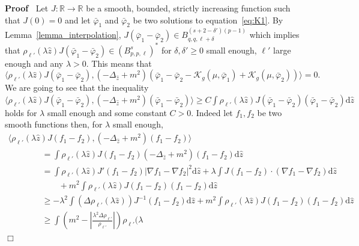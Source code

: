 \documentclass[a4paper,10pt]{article}
\newcommand{\asterisk}{\mathord{*}}
\newcommand{\mathd}{\mathrm{d}}
\newenvironment{proof}{\noindent\textbf{Proof\ }}{\hspace*{\fill}$\Box$\medskip}
\begin{document}
\begin{proof}
  Let $J : \mathbb{R} \rightarrow \mathbb{R}$ be a smooth, bounded, strictly
  increasing function such that $J (0) = 0$ and let $\bar{\varphi}_1$ and
  $\bar{\varphi}_2$ be two solutions to equation~{\eqref{eq:K1}}. By
  Lemma~\ref{lemma_interpolation}, $J (\bar{\varphi}_1 - \bar{\varphi}_2) \in
  B^{(s + 2 - \delta') (p - 1)}_{q, q, \ell + \delta}$ which implies that
  $\rho_{\ell'} (\lambda \hat{z}) J (\bar{\varphi}_1 - \bar{\varphi}_2) \in
  (B^s_{p, p, \ell})^{\asterisk}$ for $\delta, \delta' \geqslant 0$ small
  enough, $\ell'$ large enough and any $\lambda > 0$. This means that
  \[ \langle \rho_{\ell'} (\lambda \hat{z}) J (\bar{\varphi}_1 -
     \bar{\varphi}_2), (- \Delta_{\hat{z}} + m^2) (\bar{\varphi}_1 -
     \bar{\varphi}_2 - \mathcal{K}_g (\mu, \bar{\varphi}_1) + \mathcal{K}_g
     (\mu, \bar{\varphi}_2)) \rangle = 0. \]
  We are going to see that the inequality $\langle \rho_{\ell'} (\lambda
  \hat{z}) J (\bar{\varphi}_1 - \bar{\varphi}_2), (- \Delta_{\hat{z}} + m^2)
  (\bar{\varphi}_1 - \bar{\varphi}_2) \rangle \geqslant C \int \rho_{\ell'}
  (\lambda \hat{z}) J (\bar{\varphi}_1 - \bar{\varphi}_2) (\bar{\varphi}_1 -
  \bar{\varphi}_2) \mathd \hat{z}$ holds for $\lambda$ small enough and some
  constant $C > 0$. Indeed let $f_1, f_2$ be two smooth functions then, for
  $\lambda$ small enough,
  \[ \begin{array}{l}
       \langle \rho_{\ell'} (\lambda \hat{z}) J (f_1 - f_2), (-
       \Delta_{\hat{z}} + m^2) (f_1 - f_2) \rangle\\
       \qquad \qquad = \int \rho_{\ell'} (\lambda \hat{z}) J (f_1 - f_2) (-
       \Delta_{\hat{z}} + m^2) (f_1 - f_2) \mathd \hat{z}\\
       \qquad \qquad = \int \rho_{\ell'} (\lambda \hat{z}) J' (f_1 - f_2) |
       \nabla f_1 - \nabla f_2 |^2 \mathd \hat{z} + \lambda \int J (f_1 - f_2)
       \cdot (\nabla f_1 - \nabla f_2) \mathd \hat{z}\\
       \qquad \hspace{4em} + m^2 \int \rho_{\ell'} (\lambda \hat{z}) J (f_1 -
       f_2) (f_1 - f_2) \mathd \hat{z}\\
       \qquad \qquad \geqslant - \lambda^2 \int (\Delta \rho_{\ell'} (\lambda
       \hat{z})) J^{- 1} (f_1 - f_2) \mathd \hat{z} + m^2 \int \rho_{\ell'}
       (\lambda \hat{z}) J (f_1 - f_2) (f_1 - f_2) \mathd \hat{z}\\
       \qquad \qquad \geqslant \int \left( m^2 - \left| \frac{\lambda^2 \Delta
       \rho_{\ell'}}{\rho_{\ell'}} \right| \right) \rho_{\ell'} (\lambda

\end{array}\]
\end{proof}
\end{document}
